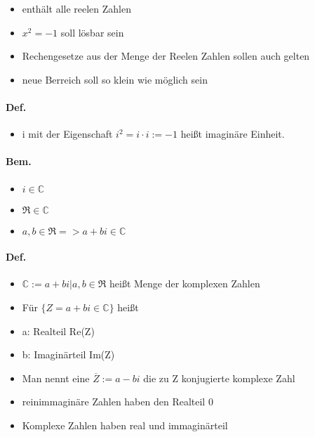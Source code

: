 \documentclass{../tudscript}
\begin{document}
\hypertarget{zahlenbereich-konstrurieren-mit}{%
\label{zahlenbereich-konstrurieren-mit}}

\begin{itemize}
\tightlist
\item
  enthält alle reelen Zahlen
\item
  \(x^{2} = -1\) soll lösbar sein
\item
  Rechengesetze aus der Menge der Reelen Zahlen sollen auch gelten
\item
  neue Berreich soll so klein wie möglich sein
\end{itemize}

\hypertarget{komplexe-zahlen}{%
\label{komplexe-zahlen}}

\hypertarget{def.}{%
\paragraph{Def.}\label{def.}}

\begin{itemize}
\tightlist
\item
  i mit der Eigenschaft \(i^{2} = i \cdot i := -1\) heißt imaginäre
  Einheit.
\end{itemize}

\hypertarget{bem.}{%
\paragraph{Bem.}\label{bem.}}

\begin{itemize}
\tightlist
\item
  \(i \in \mathbb{C}\)
\item
  \(\Re \in \mathbb{C}\)
\item
  \({a,b \in \Re => a+bi \in \mathbb{C}}\)
\end{itemize}

\hypertarget{def.-1}{%
\paragraph{Def.}\label{def.-1}}

\begin{itemize}
\tightlist
\item
  \(\mathbb{C} := {a+bi | a,b \in \Re}\) heißt Menge der komplexen
  Zahlen
\item
  Für \(\lbrace Z = a + bi \in \mathbb{C} \rbrace\) heißt
\item
  a: Realteil Re(Z)
\item
  b: Imaginärteil Im(Z)
\item
  Man nennt eine \(\overline{Z} := a - bi\) die zu Z konjugierte
  komplexe Zahl
\item
  reinimmaginäre Zahlen haben den Realteil 0
\item
  Komplexe Zahlen haben real und immaginärteil
\end{itemize}
\end{document}
